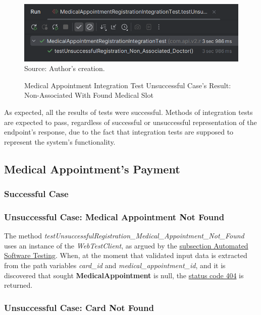 \begin{figure}[H]
	\centering
	\caption{Medical Appointment Integration Test Unsuccessful Case's Result: Non-Associated With Found Medical Slot}
	\includegraphics[width=1\linewidth]{figures/medical_appointment_registration_integration_test_unsuccessful_result_nonassociated_doctor.png}
	\label{medical_appointment_registration_integration_test_unsuccessful_result_nonassociated_doctor}
	\footnotesize Source: Author's creation.
\end{figure}

As expected, all the results of tests were successful. Methods of integration tests are expected to pass, regardless of successful or unsuccessful representation of the endpoint's response, due to the fact that integration tests are supposed to represent the system's functionality.

\subsection{Medical Appointment's Payment}

\subsubsection{Successful Case}

\subsubsection{Unsuccessful Case: Medical Appointment Not Found}

The method \textit{testUnsuccessfulRegistration\_Medical\_Appointment\_Not\_Found} uses an instance of the \textit{WebTestClient}, as argued by the \hyperref[subsection:automated_software_testing]{subsection Automated Software Testing}. When, at the moment that validated input data is extracted from the path variables \textit{card\_id}  and \textit{medical\_appointment\_id}, and it is discovered that sought \textbf{MedicalAppointment} is null, the \hyperref[tab:summary_http_status_codes]{status code 404} is returned.

\subsubsection{Unsuccessful Case: Card Not Found}

